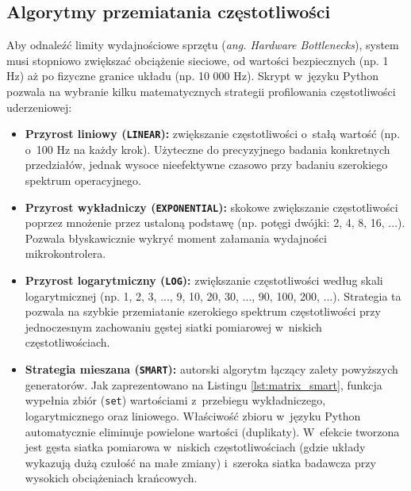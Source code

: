 \subsection{Algorytmy przemiatania częstotliwości}

Aby odnaleźć limity wydajnościowe sprzętu (\textit{ang. Hardware Bottlenecks}), system musi stopniowo zwiększać obciążenie sieciowe, od wartości bezpiecznych (np. 1 Hz) aż po fizyczne granice układu (np. 10 000 Hz).
Skrypt w~języku Python pozwala na wybranie kilku matematycznych strategii profilowania częstotliwości uderzeniowej:
\begin{itemize}
    \item \textbf{Przyrost liniowy (\texttt{LINEAR}):}
          zwiększanie częstotliwości o~stałą wartość (np. o~100 Hz na każdy krok).
          Użyteczne do precyzyjnego badania konkretnych przedziałów, jednak wysoce nieefektywne czasowo przy badaniu szerokiego spektrum operacyjnego.
    \item \textbf{Przyrost wykładniczy (\texttt{EXPONENTIAL}):}
          skokowe zwiększanie częstotliwości poprzez mnożenie przez ustaloną podstawę (np. potęgi dwójki: 2, 4, 8, 16, ...).
          Pozwala błyskawicznie wykryć moment załamania wydajności mikrokontrolera.
    \item \textbf{Przyrost logarytmiczny (\texttt{LOG}):}
          zwiększanie częstotliwości według skali logarytmicznej (np. 1, 2, 3, ..., 9, 10, 20, 30, ..., 90, 100, 200, ...).
          Strategia ta pozwala na szybkie przemiatanie szerokiego spektrum częstotliwości przy jednoczesnym zachowaniu gęstej siatki pomiarowej w~niskich częstotliwościach.
    \item \textbf{Strategia mieszana (\texttt{SMART}):}
          autorski algorytm łączący zalety powyższych generatorów.
          Jak zaprezentowano na Listingu \ref{lst:matrix_smart}, funkcja wypełnia zbiór (\texttt{set}) wartościami z~przebiegu wykładniczego, logarytmicznego oraz liniowego.
          Właściwość zbioru w~języku Python automatycznie eliminuje powielone wartości (duplikaty).
          W~efekcie tworzona jest gęsta siatka pomiarowa w~niskich częstotliwościach (gdzie układy wykazują dużą czułość na małe zmiany) i~szeroka siatka badawcza przy wysokich obciążeniach krańcowych.
\end{itemize}

